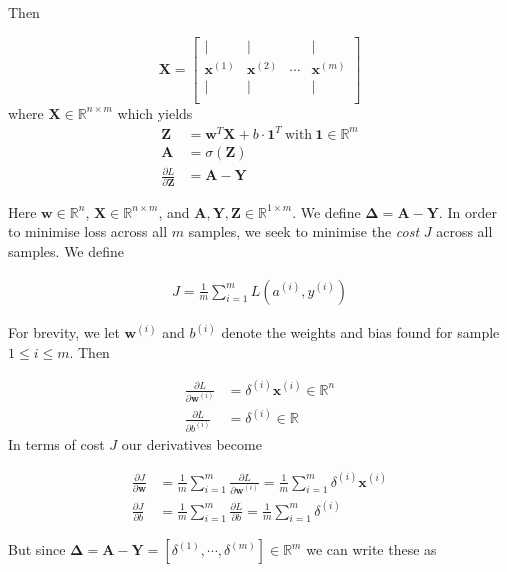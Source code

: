 \documentclass[varwidth,border=2cm]{standalone}
\begin{document}
Then


$$
\bm X = 
\left[
\begin{array}{cccc}
| & | &        & | \\
\bm{x}^{(1)} & \bm{x}^{(2)} & \cdots & \bm{x}^{(m)} \\
| & | &        & | \\
\end{array}
\right]
$$
where $\bm X \in \mathbb{R}^{n \times m}$ which yields
\begin{align}
\bm Z &= \bm w ^T \bm X + b \cdot \bm 1 ^T \ \text{with} \ \bm 1 \in \mathbb{R}^m \\
\bm A &= \sigma(\bm Z) \nonumber\\
\frac{\partial L}{\partial \bm Z} &= \bm A - \bm Y \nonumber
\end{align}

Here $\bm w \in \mathbb{R}^{n}$, $\bm X \in \mathbb{R}^{n \times m}$, and $\bm A, \bm Y, \bm Z \in \mathbb{R}^{1 \times m}$. We define $\bm\Delta = \bm A - \bm Y$. In order to minimise loss across all $m$ samples, we seek to minimise the \textit{cost} $J$ across all samples. We define

\begin{align}
J = \frac{1}{m}\displaystyle \sum _{i=1} ^m L(a^{(i)}, y^{(i)})
\end{align}

For brevity, we let $\bm w ^{(i)}$ and $b^{(i)}$ denote the weights and bias found for sample $1 \le i \le m$. Then



\begin{align}
\frac{\partial L}{\partial \bm w ^{(i)}} &= \delta ^{(i)}\bm x^{(i)} \in \mathbb{R}^n \\
\frac{\partial L}{\partial b^{(i)}} &= \delta ^{(i)} \in \mathbb{R} \nonumber
\end{align}
In terms of cost $J$ our derivatives become

\begin{align}
\frac{\partial J}{\partial \bm w} &= \frac{1}{m} \displaystyle \sum ^m _{i=1} \frac{\partial L}{\partial \bm w ^{(i)}} = \frac{1}{m} \displaystyle \sum ^m _{i=1} \delta^{(i)}\bm x^{(i)}\\
\frac{\partial J}{\partial b} &= \frac{1}{m} \displaystyle \sum ^m _{i=1} \frac{\partial L}{\partial b} = \frac{1}{m} \displaystyle \sum ^m _{i=1} \delta^{(i)} \nonumber
\end{align}

But since $\bm\Delta = \bm A - \bm Y = \left[\delta^{(1)},\cdots , \delta^{(m)}\right] \in \mathbb{R}^m$ we can write these as
\end{document}
